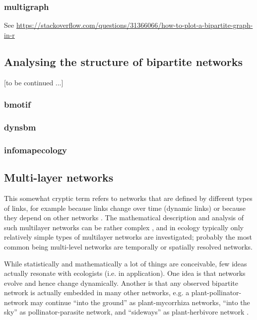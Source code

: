 \documentclass[a4paper, 11pt]{article}\usepackage[]{graphicx}\usepackage[]{color}
\newcommand{\package}[1]{\textbf{#1}}
\begin{document}
\subsubsection{\package{multigraph}}
See \url{https://stackoverflow.com/questions/31366066/how-to-plot-a-bipartite-graph-in-r}



\subsection{Analysing the structure of bipartite networks}
[to be continued ...]

\subsubsection{\package{bmotif}}

\subsubsection{\package{dynsbm}}

\subsubsection{\package{infomapecology}}


\subsection{Multi-layer networks}
This somewhat cryptic term refers to networks that are defined by different types of links, for example because links change over time (dynamic links) or because they depend on other networks \citep{Pilosof2017}. The mathematical description and analysis of such multilayer networks can be rather complex \citep{Aleta2019}, and in ecology typically only relatively simple types of multilayer networks are investigated; probably the most common being multi-level networks are temporally or spatially resolved networks.

While statistically and mathematically a lot of things are conceivable, few ideas actually resonate with ecologists (i.e. in application). One idea is that networks evolve and hence change dynamically. Another is that any observed bipartite network is actually embedded in many other networks, e.g. a plant-pollinator-network may continue ``into the ground'' as plant-mycorrhiza networks, ``into the sky'' as pollinator-parasite network, and ``sideways'' as plant-herbivore network \citep{Pocock2012}. 
\end{document}
